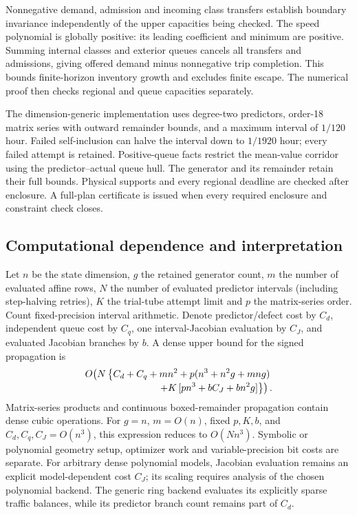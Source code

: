 \documentclass[preprint,12pt]{elsarticle}
\numberwithin{equation}{section}
\begin{document}
Nonnegative demand, admission and incoming class transfers establish boundary
invariance independently of the upper capacities being checked. The speed
polynomial is globally positive: its leading coefficient and minimum are
positive. Summing internal classes and exterior queues cancels all transfers
and admissions, giving offered demand minus nonnegative trip completion.
This bounds finite-horizon inventory growth and excludes finite escape.
The numerical proof then checks regional and queue capacities separately.

The dimension-generic implementation uses degree-two predictors, order-18
matrix series with outward remainder bounds, and a maximum interval of
$1/120$ hour. Failed self-inclusion can halve the interval down to $1/1920$
hour; every failed attempt is retained. Positive-queue facts restrict the
mean-value corridor using the predictor--actual queue hull. The generator
and its remainder retain their full bounds. Physical supports and every regional deadline
are checked after enclosure. A full-plan certificate is issued when every
required enclosure and constraint check closes.

\subsection{Computational dependence and interpretation}

Let $n$ be the state dimension, $g$ the retained generator count, $m$ the number
of evaluated affine rows, $N$ the number of evaluated predictor intervals
(including step-halving retries), $K$ the trial-tube
attempt limit and $p$ the matrix-series order. Count fixed-precision interval
arithmetic. Denote predictor/defect cost by $C_d$, independent queue cost by
$C_q$, one interval-Jacobian evaluation by $C_J$, and evaluated Jacobian
branches by $b$. A dense upper bound for the signed propagation is
\begin{equation}
 \begin{split}
 O\!\left(N\left\{C_d+C_q+mn^2
  +p(n^3+n^2g+mng)\right.\right.\\[-2pt]
 \left.\left.\hspace{12mm}+K\,[pn^3+bC_J+bn^2g]\right\}\right).
 \end{split}
 \label{eq:network-computation}
\end{equation}
Matrix-series products and continuous boxed-remainder propagation contain
dense cubic operations. For $g=n$, $m=O(n)$, fixed $p,K,b$, and
$C_d,C_q,C_J=O(n^3)$, this expression reduces to $O(Nn^3)$.
Symbolic or polynomial geometry setup, optimizer work and variable-precision
bit costs are separate. For arbitrary dense polynomial models, Jacobian
evaluation remains an explicit model-dependent cost $C_J$; its scaling
requires analysis of the chosen polynomial backend. The generic ring backend evaluates its explicitly sparse traffic
balances, while its predictor branch count remains part of $C_d$.
\end{document}
